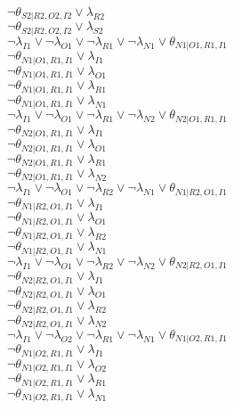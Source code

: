 $\neg\theta_{S2|R2,O2,I2} \vee \lambda_{R2}$\\
$\neg\theta_{S2|R2,O2,I2} \vee \lambda_{S2}$\\
$\neg\lambda_{I1} \vee \neg\lambda_{O1} \vee \neg\lambda_{R1} \vee \neg\lambda_{N1} \vee \theta_{N1|O1,R1,I1}$\\
$\neg\theta_{N1|O1,R1,I1} \vee \lambda_{I1}$\\
$\neg\theta_{N1|O1,R1,I1} \vee \lambda_{O1}$\\
$\neg\theta_{N1|O1,R1,I1} \vee \lambda_{R1}$\\
$\neg\theta_{N1|O1,R1,I1} \vee \lambda_{N1}$\\
$\neg\lambda_{I1} \vee \neg\lambda_{O1} \vee \neg\lambda_{R1} \vee \neg\lambda_{N2} \vee \theta_{N2|O1,R1,I1}$\\
$\neg\theta_{N2|O1,R1,I1} \vee \lambda_{I1}$\\
$\neg\theta_{N2|O1,R1,I1} \vee \lambda_{O1}$\\
$\neg\theta_{N2|O1,R1,I1} \vee \lambda_{R1}$\\
$\neg\theta_{N2|O1,R1,I1} \vee \lambda_{N2}$\\
$\neg\lambda_{I1} \vee \neg\lambda_{O1} \vee \neg\lambda_{R2} \vee \neg\lambda_{N1} \vee \theta_{N1|R2,O1,I1}$\\
$\neg\theta_{N1|R2,O1,I1} \vee \lambda_{I1}$\\
$\neg\theta_{N1|R2,O1,I1} \vee \lambda_{O1}$\\
$\neg\theta_{N1|R2,O1,I1} \vee \lambda_{R2}$\\
$\neg\theta_{N1|R2,O1,I1} \vee \lambda_{N1}$\\
$\neg\lambda_{I1} \vee \neg\lambda_{O1} \vee \neg\lambda_{R2} \vee \neg\lambda_{N2} \vee \theta_{N2|R2,O1,I1}$\\
$\neg\theta_{N2|R2,O1,I1} \vee \lambda_{I1}$\\
$\neg\theta_{N2|R2,O1,I1} \vee \lambda_{O1}$\\
$\neg\theta_{N2|R2,O1,I1} \vee \lambda_{R2}$\\
$\neg\theta_{N2|R2,O1,I1} \vee \lambda_{N2}$\\
$\neg\lambda_{I1} \vee \neg\lambda_{O2} \vee \neg\lambda_{R1} \vee \neg\lambda_{N1} \vee \theta_{N1|O2,R1,I1}$\\
$\neg\theta_{N1|O2,R1,I1} \vee \lambda_{I1}$\\
$\neg\theta_{N1|O2,R1,I1} \vee \lambda_{O2}$\\
$\neg\theta_{N1|O2,R1,I1} \vee \lambda_{R1}$\\
$\neg\theta_{N1|O2,R1,I1} \vee \lambda_{N1}$\\
